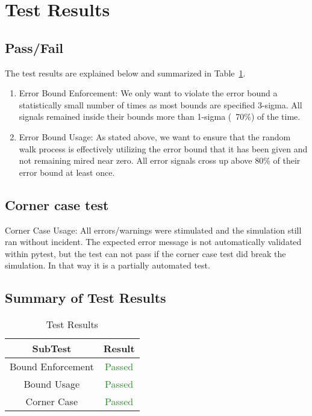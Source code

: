 \section{Test Results}

\subsection{Pass/Fail}
The test results are explained below and summarized in Table~\ref{tab:results}.

\begin{enumerate}
	\item{Error Bound Enforcement: We only want to violate the error bound a 
		statistically small number of times as most bounds are specified 3-sigma.  
		All signals remained inside their bounds more than 1-sigma (~70\%) of the time.  }
	\item{Error Bound Usage: As stated above, we want to ensure that the random 
		walk process is effectively utilizing the error bound that it has been 
		given and not remaining mired near zero.  All error signals cross up above 
		80\% of their error bound at least once.}
\end{enumerate}

\subsection{Corner case test} 

Corner Case Usage: All errors/warnings were stimulated and the simulation still ran without incident.
The expected error message is not automatically validated within pytest, but the test can not pass
if the corner case test did break the simulation. In that way it is a partially automated test. 

\subsection{Summary of Test Results}

\begin{table}[htbp]
	\caption{Test Results}
	\label{tab:results}
	\centering \fontsize{10}{10}\selectfont
	\begin{tabular}{|c||c|}
		\hline
		SubTest & Result \\ \hline \hline
		Bound Enforcement& \textcolor{ForestGreen}{Passed} \\ \hline
		Bound Usage &  \textcolor{ForestGreen}{Passed}\\ \hline
		Corner Case &  \textcolor{ForestGreen}{Passed}\\ \hline
	\end{tabular}
\end{table}


